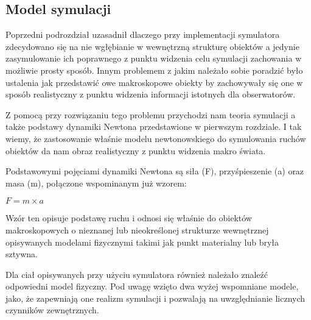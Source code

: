 \subsection{Model symulacji}
\par{
Poprzedni podrozdział uzasadnił dlaczego przy implementacji symulatora zdecydowano się na nie wgłębianie w wewnętrzną strukturę obiektów a jedynie zasymulowanie ich poprawnego z punktu widzenia celu symulacji zachowania w możliwie prosty sposób. Innym problemem z jakim należało sobie poradzić było ustalenia jak przedstawić owe makroskopowe obiekty by zachowywały się one w sposób realistyczny z punktu widzenia informacji istotnych dla obserwatorów.
}
\par{
Z pomocą przy rozwiązaniu tego problemu przychodzi nam teoria symulacji a także podstawy dynamiki Newtona przedstawione w pierwszym rozdziale.
I tak wiemy, że zastosowanie właśnie modelu newtonowskiego do symulowania ruchów obiektów da nam obraz realistyczny z punktu widzenia makro świata.
}
\par{
Podstawowymi pojęciami dynamiki Newtona są siła (F), przyśpieszenie (a) oraz masa (m), połączone wspominanym już wzorem:
\begin{center}
$F = m \times a$
\end{center}
Wzór ten opisuje podstawę ruchu i odnosi się właśnie do obiektów makroskopowych o nieznanej lub nieokreślonej strukturze wewnętrznej opisywanych modelami fizycznymi takimi jak punkt materialny lub bryła sztywna.
}
\par{
Dla ciał opisywanych przy użyciu symulatora również należało znaleźć odpowiedni model fizyczny. Pod uwagę wzięto dwa wyżej wspomniane modele, jako, że zapewniają one realizm symulacji i pozwalają na uwzględnianie licznych czynników zewnętrznych.
}

